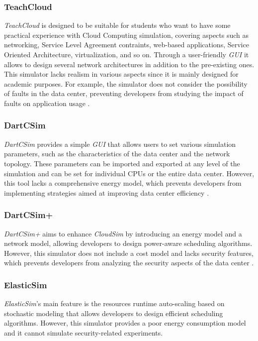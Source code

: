 {\subsubsection*{TeachCloud}
\emph{TeachCloud} \cite{jararweh2013teachcloud} is designed to be suitable for students who want to have some practical experience with Cloud Computing simulation, covering aspects such as networking, Service Level Agreement contraints, web-based applications, Service Oriented Architecture, virtualization, and so on. Through a user-friendly \emph{GUI} it allows to design several network architectures in addition to the pre-existing ones. This simulator lacks realism in various aspects since it is mainly designed for academic purposes. For example, the simulator does not consider the possibility of faults in the data center, preventing developers from studying the impact of faults on application usage \cite{mansouri2020cloud} \cite{patel2016comprehensive}.
\subsubsection*{DartCSim}
\emph{DartCSim} \cite{li2012dartcsim} provides a simple \emph{GUI} that allows users to set various simulation parameters, such as the characteristics of the data center and the network topology. These parameters can be imported and exported at any level of the simulation and can be set for individual CPUs or the entire data center. However, this tool lacks a comprehensive energy model, which prevents developers from implementing strategies aimed at improving data center efficiency \cite{mansouri2020cloud}.
\subsubsection*{DartCSim+}
\emph{DartCSim+} \cite{li2013dartcsim+} aims to enhance \emph{CloudSim} by introducing an energy model and a network model, allowing developers to design power-aware scheduling algorithms. However, this simulator does not include a cost model and lacks security features, which prevents developers from analyzing the security aspects of the data center \cite{mansouri2020cloud}.
\subsubsection*{ElasticSim}
\emph{ElasticSim}'s \cite{cai2017elasticsim} main feature is the resources runtime auto-scaling based on stochastic modeling that allows developers to design efficient scheduling algorithms. However, this simulator provides a poor energy consumption model and it cannot simulate security-related experiments. \cite{mansouri2020cloud}
}
